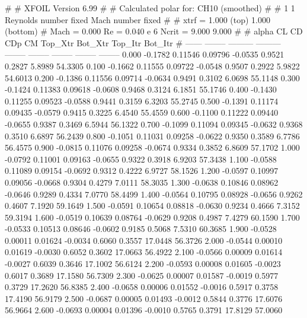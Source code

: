 #  
#       XFOIL         Version 6.99
#  
# Calculated polar for: CH10 (smoothed)                                 
#  
# 1 1 Reynolds number fixed          Mach number fixed         
#  
# xtrf =   1.000 (top)        1.000 (bottom)  
# Mach =   0.000     Re =     0.040 e 6     Ncrit =   9.000  9.000
#  
#   alpha    CL        CD       CDp       CM     Top_Xtr  Bot_Xtr  Top_Itr  Bot_Itr
#  ------ -------- --------- --------- -------- -------- -------- -------- --------
   0.000  -0.1782   0.11546   0.09796  -0.0535   0.9521   0.2827   5.8989  54.3305
   0.100  -0.1662   0.11555   0.09722  -0.0548   0.9507   0.2922   5.9822  54.6013
   0.200  -0.1386   0.11556   0.09714  -0.0634   0.9491   0.3102   6.0698  55.1148
   0.300  -0.1424   0.11383   0.09618  -0.0608   0.9468   0.3124   6.1851  55.1746
   0.400  -0.1430   0.11255   0.09523  -0.0588   0.9441   0.3159   6.3203  55.2745
   0.500  -0.1391   0.11174   0.09435  -0.0579   0.9415   0.3225   6.4540  55.4559
   0.600  -0.1100   0.11222   0.09440  -0.0655   0.9387   0.3469   6.5944  56.1322
   0.700  -0.1099   0.11094   0.09345  -0.0632   0.9368   0.3510   6.6897  56.2439
   0.800  -0.1051   0.11031   0.09258  -0.0622   0.9350   0.3589   6.7786  56.4575
   0.900  -0.0815   0.11076   0.09258  -0.0674   0.9334   0.3852   6.8609  57.1702
   1.000  -0.0792   0.11001   0.09163  -0.0655   0.9322   0.3918   6.9203  57.3438
   1.100  -0.0588   0.11089   0.09154  -0.0692   0.9312   0.4222   6.9727  58.1526
   1.200  -0.0597   0.10997   0.09056  -0.0668   0.9304   0.4279   7.0111  58.3035
   1.300  -0.0638   0.10846   0.08962  -0.0646   0.9289   0.4334   7.0770  58.4499
   1.400  -0.0564   0.10795   0.08928  -0.0656   0.9262   0.4607   7.1920  59.1649
   1.500  -0.0591   0.10654   0.08818  -0.0630   0.9234   0.4666   7.3152  59.3194
   1.600  -0.0519   0.10639   0.08764  -0.0629   0.9208   0.4987   7.4279  60.1590
   1.700  -0.0533   0.10513   0.08646  -0.0602   0.9185   0.5068   7.5310  60.3685
   1.900  -0.0528   0.00011   0.01624  -0.0034   0.6060   0.3557  17.0448  56.3726
   2.000  -0.0544   0.00010   0.01619  -0.0030   0.6052   0.3602  17.0663  56.4922
   2.100  -0.0566   0.00009   0.01614  -0.0027   0.6039   0.3646  17.1002  56.6124
   2.200  -0.0593   0.00008   0.01605  -0.0023   0.6017   0.3689  17.1580  56.7309
   2.300  -0.0625   0.00007   0.01587  -0.0019   0.5977   0.3729  17.2620  56.8385
   2.400  -0.0658   0.00006   0.01552  -0.0016   0.5917   0.3758  17.4190  56.9179
   2.500  -0.0687   0.00005   0.01493  -0.0012   0.5844   0.3776  17.6076  56.9664
   2.600  -0.0693   0.00004   0.01396  -0.0010   0.5765   0.3791  17.8129  57.0060
